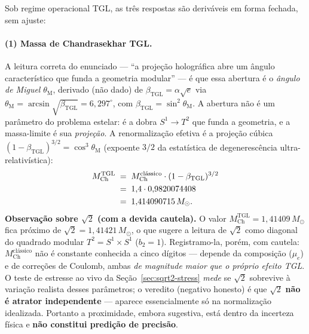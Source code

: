 \documentclass[12pt,a4paper]{article}
\newcommand{\betatgl}{\beta_{\text{TGL}}}
\newcommand{\thetaM}{\theta_{\text{M}}}
\newcommand{\TGL}{\textsc{TGL}}
\begin{document}
Sob regime operacional \TGL{}, as três respostas são deriváveis em forma
fechada, sem ajuste:

\paragraph{(1) Massa de Chandrasekhar TGL.}
A leitura correta do enunciado --- ``a projeção holográfica abre um ângulo
característico que funda a geometria modular'' --- é que essa abertura é o
\emph{ângulo de Miguel} $\thetaM$, derivado (não dado) de
$\betatgl = \alpha\sqrt{e}$ via $\thetaM = \arcsin\sqrt{\betatgl} = 6{,}297^{\circ}$,
com $\betatgl = \sin^{2}\thetaM$.  A abertura não é um parâmetro do problema
estelar: é a dobra $S^1\to T^2$ que funda a geometria, e a massa-limite é sua
\emph{projeção}.  A renormalização efetiva é a projeção cúbica
$(1-\betatgl)^{3/2} = \cos^{3}\thetaM$ (expoente $3/2$ da estatística de
degenerescência ultra-relativística):
\begin{align}
M_{\text{Ch}}^{\text{TGL}} &\;=\; M_{\text{Ch}}^{\text{clássico}} \cdot (1 - \betatgl)^{3/2} \notag \\
                    &\;=\; 1{,}4 \cdot 0{,}9820074408 \notag \\
                    &\;=\; 1{,}414090715\,M_{\odot}.
\label{eq:M-Ch-TGL}
\end{align}
\textbf{Observação sobre $\sqrt{2}$ (com a devida cautela).} O valor
$M_{\text{Ch}}^{\text{TGL}} = 1{,}41409\,M_{\odot}$ fica
próximo de $\sqrt{2} = 1{,}41421\,M_{\odot}$, o que
sugere a leitura de $\sqrt{2}$ como diagonal do quadrado modular
$T^{2} = S^{1} \times S^{1}$ ($b_2 = 1$).  Registramo-la, porém, com cautela:
$M_{\text{Ch}}^{\text{clássico}}$ não é constante conhecida a cinco dígitos ---
depende da composição ($\mu_e$) e de correções de Coulomb, ambas
\emph{de magnitude maior que o próprio efeito \TGL{}}.  O teste de estresse ao
vivo da Seção~\ref{sec:sqrt2-stress} \emph{mede} se $\sqrt{2}$ sobrevive à
variação realista desses parâmetros; o veredito (negativo honesto) é que
$\sqrt{2}$ \textbf{não é atrator independente} --- aparece essencialmente só na
normalização idealizada.  Portanto a proximidade, embora sugestiva, está dentro
da incerteza física e \textbf{não constitui predição de precisão}.
\end{document}
